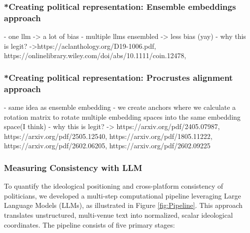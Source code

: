 \documentclass[11pt,letterpaper]{article}
\theoremstyle{plain}
\begin{document}
\subsubsection{*Creating political representation: Ensemble embeddings approach}
- one llm -> a lot of bias
- multiple llms ensembled -> less bias (yay)
- why this is legit? ->https://aclanthology.org/D19-1006.pdf, https://onlinelibrary.wiley.com/doi/abs/10.1111/coin.12478, 
\subsubsection{*Creating political representation: Procrustes alignment approach}
- same idea as ensemble embedding 
- we create anchors where we calculate a rotation matrix to rotate multiple embedding spaces into the same embedding space(I think)
- why this is legit? -> https://arxiv.org/pdf/2405.07987,  https://arxiv.org/pdf/2505.12540, https://arxiv.org/pdf/1805.11222, https://arxiv.org/pdf/2602.06205,
https://arxiv.org/pdf/2602.09225


\subsubsection{Measuring Consistency with LLM}
To quantify the ideological positioning and cross-platform consistency of politicians, we developed a multi-step computational pipeline leveraging Large Language Models (LLMs), as illustrated in Figure \ref{fig:Pipeline}. This approach translates unstructured, multi-venue text into normalized, scalar ideological coordinates. The pipeline consists of five primary stages:
\end{document}

